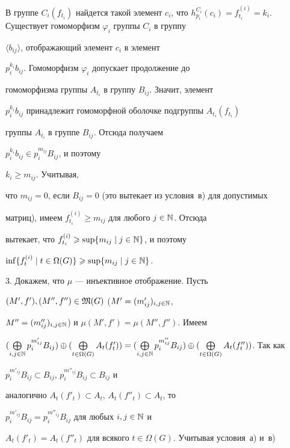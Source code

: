 \begin{pf}
В группе $C_i(f_{t_i})$ найдется такой элемент $c_i$, что $h_{p_i}^{C_i}(c_i)=


f_{t_i}^{(i)}=k_i$. Существует гомоморфизм $\varphi_i$ группы $C_i$ в группу


$\langle b_{ij}\rangle$, отображающий элемент $c_i$ в элемент


$p_i^{k_i}b_{ij}$. Гомоморфизм $\varphi_i$ допускает продолжение до


гомоморфизма группы $A_{t_i}$ в группу $B_{ij}$. Значит, элемент


$p_i^{k_i}b_{ij}$ принадлежит гомоморфной оболочке подгруппы $A_{t_i}(f_{t_i})$


группы $A_{t_i}$ в группе $B_{ij}$. Отсюда получаем


$p_i^{k_i}b_{ij}\in p_i^{m_{ij}}B_{ij}$, и поэтому


$k_i\geqslant m_{ij}$. Учитывая,


что $m_{ij}=0$, если $B_{ij}=0$ (это вытекает из условия~в) для допустимых


матриц), имеем  $f_{t_i}^{(i)}\geqslant m_{ij}$ для любого $j\in\Bbb N$. Отсюда


вытекает, что $f_{t_i}^{(i)}\geqslant\sup\{m_{ij}\mid j\in{\Bbb N}\}$, и поэтому


$\inf\{f_t^{(i)}\mid t\in\Omega(G)\}\geqslant\sup\{m_{ij}\mid j\in{\Bbb N}\}$.





3. Докажем, что $\mu$ --- инъективное отображение. Пусть


$(M', f'), (M'', f'')\in\frak M(G)$ ($M'=(m'_{ij})_{i,j\in\Bbb N}$,


$M''=(m''_{ij})_{i,j\in\Bbb N}$) и $\mu (M', f')=\mu (M'', f'')$. Имеем


$(\bigoplus\limits_{i,j\in\Bbb N}p_i^{m'_{ij}}B_{ij})\oplus


(\bigoplus\limits_{t\in\Omega(G)}A_t(f'_t))=


(\bigoplus\limits_{i,j\in\Bbb N}p_i^{m''_{ij}}B_{ij})\oplus


(\bigoplus\limits_{t\in\Omega(G)}A_t(f''_t))$. Так как


$p_i^{m'_{ij}}B_{ij}\subset B_{ij}$, $p_i^{m''_{ij}}B_{ij}\subset B_{ij}$ и


аналогично $A_t(f'_t)\subset A_t$, $A_t(f''_t)\subset A_t$, то


$p_i^{m'_{ij}}B_{ij}=p_i^{m''_{ij}}B_{ij}$ для любых $i,j\in\Bbb N$ и


$A_t(f'_t)=A_t(f''_t)$ для всякого $t\in\Omega(G)$. Учитывая условия~а) и~в)



\end{pf}

